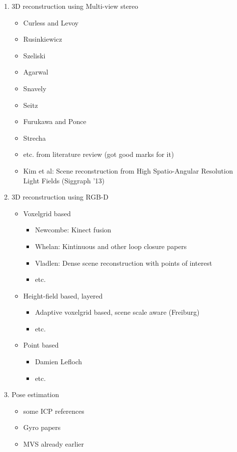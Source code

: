 \documentclass{ucl_thesis}
\begin{document}
	\begin{enumerate}
		\item 3D reconstruction using Multi-view stereo
		\begin{itemize}
			\item Curless and Levoy
			\item Rusinkiewicz
			\item Szeliski
			\item Agarwal
			\item Snavely
			\item Seitz
			\item Furukawa and Ponce
			\item Strecha
			\item etc. from literature review (got good marks for it)
			\item Kim et al: Scene reconstruction from High Spatio-Angular Resolution Light Fields (Siggraph '13)
		\end{itemize}

		\item 3D reconstruction using RGB-D
		\begin{itemize}
			\item Voxelgrid based
			\begin{itemize}
				\item Newcombe: Kinect fusion
				\item Whelan: Kintinuous and other loop closure papers
				\item Vladlen: Dense scene reconstruction with points of interest
				\item etc.
			\end{itemize}

			\item Height-field based, layered
			\begin{itemize}
				\item Adaptive voxelgrid based, scene scale aware (Freiburg)
				\item etc.
			\end{itemize}

			\item Point based
			\begin{itemize}
				\item Damien Lefloch
				\item etc.
			\end{itemize}

			
		\end{itemize}
			
 		\item Pose estimation
		\begin{itemize}
			\item some ICP references
			\item Gyro papers
			\item MVS already earlier
		\end{itemize}
		

\end{enumerate}
\end{document}
